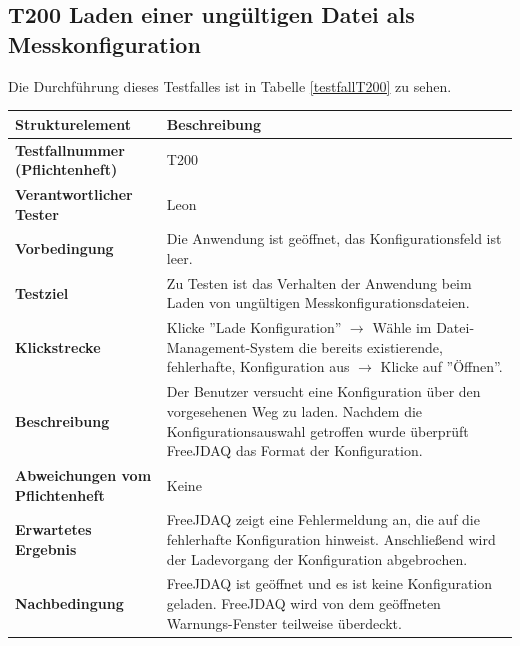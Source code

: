 \documentclass[parskip=full]{scrartcl}
\begin{document}
\subsection{\textbf{T200} Laden einer ungültigen Datei als Messkonfiguration}

Die Durchführung dieses Testfalles ist in Tabelle \ref{testfallT200} zu sehen.

\begin{table}[h]
    \begin{tabular}{| p{4cm} | p{10cm} |}
        \hline
        \textbf{Strukturelement} & \textbf{Beschreibung} \\ \hline
        \textbf{Testfallnummer (Pflichtenheft)}
        & 
        T200
        \\ \hline
        \textbf{Verantwortlicher Tester}
        & 
        Leon
        \\ \hline
        \textbf{Vorbedingung}
        & 
        Die Anwendung ist geöffnet, das Konfigurationsfeld ist leer.
        \\ \hline
        \textbf{ Testziel}
        & 
        Zu Testen ist das Verhalten der Anwendung beim Laden von ungültigen
        Messkonfigurationsdateien.
        \\ \hline
        
        \textbf{Klickstrecke}
        & 
        Klicke ''Lade Konfiguration'' $\rightarrow$ Wähle im Datei-Management-System die bereits existierende, fehlerhafte, Konfiguration aus $\rightarrow$ Klicke auf ''Öffnen''.
        \\ \hline
        
        \textbf{ Beschreibung}
        & 
        Der Benutzer versucht eine Konfiguration über den vorgesehenen Weg zu laden. Nachdem die Konfigurationsauswahl getroffen wurde überprüft FreeJDAQ das Format der Konfiguration.
        \\ \hline
        
        \textbf{Abweichungen vom Pflichtenheft}
        & 
        Keine
        
        \\ \hline
        
        \textbf{Erwartetes Ergebnis}
        & 
        FreeJDAQ zeigt eine Fehlermeldung an, die auf die fehlerhafte Konfiguration hinweist. Anschließend wird der Ladevorgang der Konfiguration abgebrochen.
        \\ \hline
        
        \textbf{Nachbedingung}
        & 
        FreeJDAQ ist geöffnet und es ist keine Konfiguration geladen. FreeJDAQ wird von dem geöffneten Warnungs-Fenster teilweise überdeckt.
        \\ \hline
        

\end{tabular}
\end{table}
\end{document}
